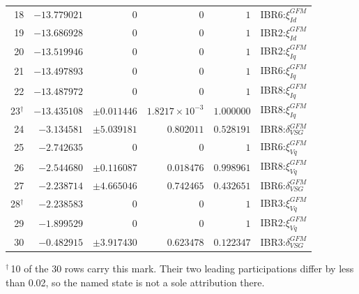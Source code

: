\begin{longtable}{@{}r r r r r l@{}}
18 & $-13.779021$ & $0$ & $0$ & $1$ & IBR6:$\xi_{Id}^{GFM}$ \\ 
19 & $-13.686928$ & $0$ & $0$ & $1$ & IBR2:$\xi_{Id}^{GFM}$ \\ 
20 & $-13.519946$ & $0$ & $0$ & $1$ & IBR2:$\xi_{Iq}^{GFM}$ \\ 
21 & $-13.497893$ & $0$ & $0$ & $1$ & IBR6:$\xi_{Iq}^{GFM}$ \\ 
22 & $-13.487972$ & $0$ & $0$ & $1$ & IBR8:$\xi_{Iq}^{GFM}$ \\ 
23$^{\dagger}$ & $-13.435108$ & $\pm0.011446$ & $1.8217\times10^{-3}$ & $1.000000$ & IBR8:$\xi_{Iq}^{GFM}$ \\ 
24 & $-3.134581$ & $\pm5.039181$ & $0.802011$ & $0.528191$ & IBR8:$\delta_{VSG}^{GFM}$ \\ 
25 & $-2.742635$ & $0$ & $0$ & $1$ & IBR6:$\xi_{Vq}^{GFM}$ \\ 
26 & $-2.544680$ & $\pm0.116087$ & $0.018476$ & $0.998961$ & IBR8:$\xi_{Vq}^{GFM}$ \\ 
27 & $-2.238714$ & $\pm4.665046$ & $0.742465$ & $0.432651$ & IBR6:$\delta_{VSG}^{GFM}$ \\ 
28$^{\dagger}$ & $-2.238583$ & $0$ & $0$ & $1$ & IBR3:$\xi_{Vq}^{GFM}$ \\ 
29 & $-1.899529$ & $0$ & $0$ & $1$ & IBR2:$\xi_{Vq}^{GFM}$ \\ 
30 & $-0.482915$ & $\pm3.917430$ & $0.623478$ & $0.122347$ & IBR3:$\delta_{VSG}^{GFM}$ \\ 
\bottomrule
\end{longtable}
\noindent$^{\dagger}$\,10 of the 30 rows carry this mark. Their two leading participations differ by less than 0.02, so the named state is not a sole attribution there.\par
\endgroup
